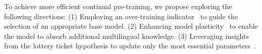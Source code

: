 To achieve more efficient continual pre-training, we propose exploring the following directions:
(1) Employing an over-training indicator~\citep{ouyang2024low} to guide the selection of an appropriate base model.
(2) Enhancing model plasticity~\citep{Chen2023ImprovingLP} to enable the model to absorb additional multilingual knowledge.
(3) Leveraging insights from the lottery ticket hypothesis to update only the most essential parameters~\citep{Yuan2024KSLotteryFC}.
